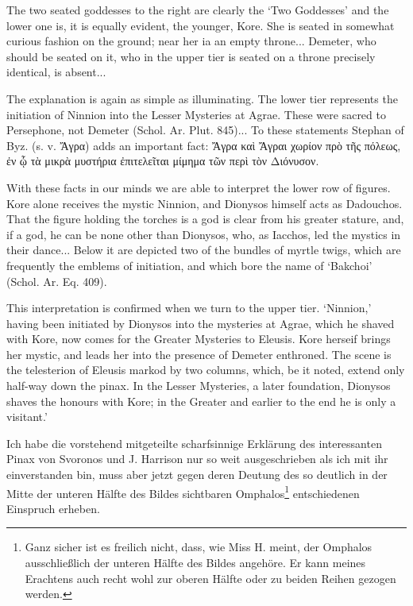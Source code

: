 \documentclass[a4paper, 11pt, oneside]{article}
\begin{document}
The two seated goddesses to the right are clearly the `Two Goddesses' and the lower one is, it is equally evident, the younger, Kore. She is seated in somewhat curious fashion on the ground; near her ia an empty throne... Demeter, who should be seated on it, who in the upper tier is seated on a throne precisely identical, is absent...

The explanation is again as simple as illuminating. The lower tier represents the initiation of Ninnion into the Lesser Mysteries at Agrae. These were sacred to Persephone, not Demeter (Schol. Ar. Plut. 845)... To these statements Stephan of Byz. (s. v. Ἄγρα) adds an important fact: Ἄγρα καὶ Ἄγραι χωρίον πρὸ τῆς πόλεως, ἐν ᾧ τὰ μικρὰ μυστήρια ἐπιτελεῖται μίμημα τῶν περὶ τὸν Διόνυσον.

With these facts in our minds we are able to interpret the lower row of figures. Kore alone receives the mystic Ninnion, and Dionysos himself acts as Dadouchos. That the figure holding the torches is a god is clear from his greater stature, and, if a god, he can be none other than Dionysos, who, as Iacchos, led the mystics in their dance... Below it are depicted two of the bundles of myrtle twigs, which are frequently the emblems of initiation, and which bore the name of `Bakchoi' (Schol. Ar. Eq. 409).

This interpretation is confirmed when we turn to the upper tier. `Ninnion,' having been initiated by Dionysos into the mysteries at Agrae, which he shaved with Kore, now comes for the Greater Mysteries to Eleusis. Kore herseif brings her mystic, and leads her into the presence of Demeter enthroned. The scene is the telesterion of Eleusis markod by two columns, which, be it noted, extend only half-way down the pinax. In the Lesser Mysteries, a later foundation, Dionysos shaves the honours with Kore; in the Greater and earlier to the end he is only a visitant.'

Ich habe die vorstehend mitgeteilte scharfsinnige Erklärung des interessanten Pinax von Svoronos und J. Harrison nur so weit ausgeschrieben als ich mit ihr einverstanden bin, muss aber jetzt gegen deren Deutung des so deutlich in der Mitte der unteren Hälfte des Bildes sichtbaren Omphalos\footnote{Ganz sicher ist es freilich nicht, dass, wie Miss H. meint, der Omphalos ausschließlich der unteren Hälfte des Bildes angehöre. Er kann meines Erachtens auch recht wohl zur oberen Hälfte oder zu beiden Reihen gezogen werden.} entschiedenen Einspruch erheben.
\end{document}
